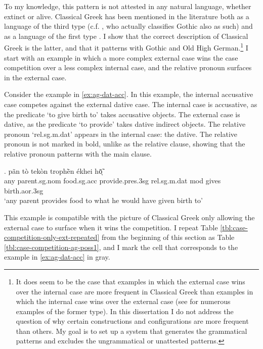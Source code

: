To my knowledge, this pattern is not attested in any natural language, whether extinct or alive. Classical Greek has been mentioned in the literature both as a language of the third type (c.f. \citealt[120]{cinqueforthcoming}, who actually classifies Gothic also as such) and as a language of the first type \citep[cf.][41]{grosu1987}. I show that the correct description of Classical Greek is the latter, and that it patterns with Gothic and Old High German.\footnote{
It does seem to be the case that examples in which the external case wins over the internal case are more frequent in Classical Greek than examples in which the internal case wins over the external case (see \citealt{kakarikos2014} for numerous examples of the former type).
In this dissertation I do not address the question of why certain constructions and configurations are more frequent than others. My goal is to set up a system that generates the grammatical patterns and excludes the ungrammatical or unattested patterns.
}
I start with an example in which a more complex external case wins the case competition over a less complex internal case, and the relative pronoun surfaces in the external case.

Consider the example in \ref{ex:ag-dat-acc}. In this example, the internal accusative case competes against the external dative case.
The internal case is accusative, as the predicate  `to give birth to' takes accusative objects.
The external case is dative, as the predicate  `to provide' takes dative indirect objects.
The relative pronoun  `\ac{rel}.\ac{sg}.\ac{m}.\ac{dat}' appears in the internal case: the dative. The relative pronoun is not marked in bold, unlike as the relative clause, showing that the relative pronoun patterns with the main clause.

\exg. pãn {tò tekòn} trophḕn ékhei hō̃ͅ  \\
any parent.\ac{sg}.\ac{nom} food.\ac{sg}.\ac{acc} provide.\ac{pres}.3\ac{sg}\scsub{[dat]} \ac{rel}.\ac{sg}.\ac{m}.\ac{dat} \ac{mod} {gives birth}.\ac{aor}.3\ac{sg}\scsub{[acc]}\\
`any parent provides food to what he would have given birth to' \label{ex:ag-dat-acc}

This example is compatible with the picture of Classical Greek only allowing the external case to surface when it wins the competition. I repeat Table \ref{tbl:case-competition-only-ext-repeated} from the beginning of this section as Table \ref{tbl:case-competition-ag-poss1}, and I mark the cell that corresponds to the example in \ref{ex:ag-dat-acc} in gray.

